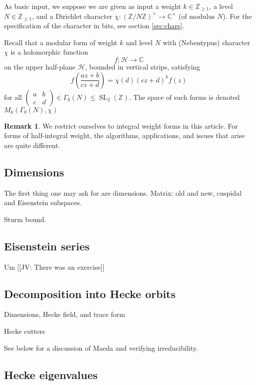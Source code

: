 \documentclass[11pt]{amsart}
\numberwithin{equation}{subsection}
\theoremstyle{plain}
\theoremstyle{definition}
\newtheorem{rmk}[equation]{Remark}
\newcommand{\Z}{\mathbb{Z}}
\newcommand{\C}{\mathbb{C}}
\newcommand{\defi}[1]{\textsf{#1}} 	%
\DeclareMathOperator{\SL}{SL}
\newcommand{\jv}[1]{{\color{red} \textsf{[[JV: #1]]}}}
\begin{document}
As basic input, we suppose we are given as input a weight $k \in \Z_{\geq 1}$, a level $N \in \Z_{\geq 1}$, and a Dirichlet character $\chi \colon (\Z/N\Z)^\times \to \C^\times$ (of modulus $N$).  For the specification of the character in bits, see section \ref{sec:chars}.  

Recall that a \defi{modular form} of weight $k$ and level $N$ with (Nebentypus) character $\chi$ is a holomorphic function
\[ f \colon \mathcal{H} \to \C \]
on the upper half-plane $\mathcal{H}$, bounded in vertical strips, satisfying
\[ f\left(\frac{az+b}{cz+d}\right)=\chi(d)(cz+d)^k f(z) \]
for all $\begin{pmatrix} a & b \\ c & d \end{pmatrix} \in \Gamma_0(N) \leq \SL_2(\Z)$.  The space of such forms is denoted $M_k(\Gamma_0(N),\chi)$

\begin{rmk}
We restrict ourselves to integral weight forms in this article.  For forms of half-integral weight, the algorithms, applications, and issues that arise are quite different.  
\end{rmk}

\subsection{Dimensions}

The first thing one may ask for are dimensions.  Matrix: old and new, cuspidal and Eisenstein subspaces.

Sturm bound.

\subsection{Eisenstein series}

Um \jv{There was an exercise}

\subsection{Decomposition into Hecke orbits}

Dimensions, Hecke field, and trace form

Hecke cutters

See below for a discussion of Maeda and verifying irreducibility.

\subsection{Hecke eigenvalues}
\end{document}
